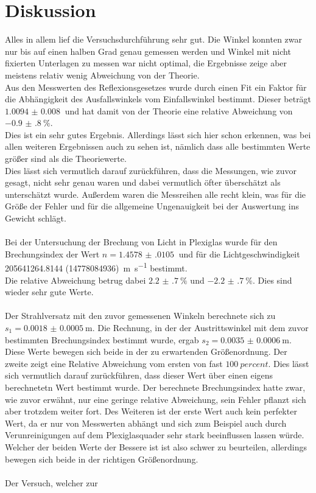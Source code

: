 \newpage
\section{Diskussion}

Alles in allem lief die Versuchsdurchführung sehr gut.
Die Winkel konnten zwar nur bis auf einen halben Grad genau gemessen werden und Winkel mit nicht fixierten Unterlagen zu messen war nicht optimal, die Ergebnisse zeige aber meistens relativ wenig Abweichung von der Theorie.\\

Aus den Messwerten des Reflexionsgesetzes wurde durch einen Fit ein Faktor für die Abhängigkeit des Ausfallswinkels vom Einfallswinkel bestimmt.
Dieser beträgt $\SI{1.0094(80)}{}$  und hat damit von der Theorie eine relative Abweichung von $\SI{-0.9(8)}{\percent}$.\\
Dies ist ein sehr gutes Ergebnis. Allerdings lässt sich hier schon erkennen, was bei allen weiteren Ergebnissen auch zu sehen ist, nämlich dass alle bestimmten Werte größer sind als die Theoriewerte.\\
Dies lässt sich vermutlich darauf zurückführen, dass die Messungen, wie zuvor gesagt, nicht sehr genau waren und dabei vermutlich öfter überschätzt als unterschätzt wurde.
Außerdem waren die Messreihen alle recht klein, was für die Größe der Fehler und für die allgemeine Ungenauigkeit bei der Auswertung ins Gewicht schlägt.\\\\
Bei der Untersuchung der Brechung von Licht in Plexiglas wurde für den Brechungsindex der Wert $n= \SI{1.4578(0105)}{}$ und für die Lichtgeschwindigkeit \SI{205641264.8144 (14778084936)}{\metre\per\second} bestimmt.\\
Die relative Abweichung betrug dabei $\SI{2.2(7)}{\percent}$ und $\SI{-2.2(7)}{\percent}$. Dies sind wieder sehr gute Werte.\\\\
Der Strahlversatz mit den zuvor gemessenen Winkeln berechnete sich zu $s_1=\SI{0.0018(5)}{\metre}$. 
Die Rechnung, in der der Austrittswinkel mit dem zuvor bestimmten Brechungsindex bestimmt wurde, ergab $s_2=\SI{0.0035(6)}{\metre}$.\\
Diese Werte bewegen sich beide in der zu erwartenden Größenordnung. Der zweite zeigt eine Relative Abweichung vom ersten von fast $\SI{100}{percent}$. 
Dies lässt sich vermutlich darauf zurückführen, dass dieser Wert über einen eigens berechnetetn Wert bestimmt wurde. 
Der berechnete Brechungsindex hatte zwar, wie zuvor erwähnt, nur eine geringe relative Abweichung, sein Fehler pflanzt sich aber trotzdem weiter fort.
Des Weiteren ist der erste Wert auch kein perfekter Wert, da er nur von Messwerten abhängt und sich zum Beispiel auch durch Verunreinigungen auf dem Plexiglasquader sehr stark beeinflussen lassen würde.\\
Welcher der beiden Werte der Bessere ist ist also schwer zu beurteilen, allerdings bewegen sich beide in der richtigen Größenordnung.\\\\
Der Versuch, welcher zur 

